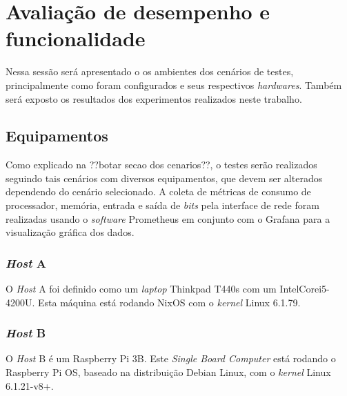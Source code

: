 \section{Avaliação de desempenho e funcionalidade}
Nessa sessão será apresentado o os ambientes dos cenários de testes, principalmente como foram configurados e seus respectivos \textit{hardwares}. Também será exposto os resultados dos experimentos realizados neste trabalho.
\subsection{Equipamentos}
Como explicado na ??botar secao dos cenarios??, o testes serão realizados seguindo tais cenários com diversos equipamentos, que devem ser alterados dependendo do cenário selecionado.
A coleta de métricas de consumo de processador, memória, entrada e saída de \textit{bits} pela interface de rede
foram realizadas usando o \textit{software} Prometheus em conjunto com o Grafana para a visualização gráfica dos dados.


\subsubsection{\textit{Host} A}
O \textit{Host} A foi definido como um \textit{laptop} Thinkpad T440s com um Intel\textregistered\space Core\texttrademark\space i5-4200U. Esta máquina está rodando NixOS com o \textit{kernel} Linux 6.1.79. %

\subsubsection{\textit{Host} B}
O \textit{Host} B é um Raspberry Pi 3B. Este \textit{Single Board Computer} está rodando o Raspberry Pi OS, baseado na distribuição Debian Linux, com o \textit{kernel} Linux 6.1.21-v8+. %


